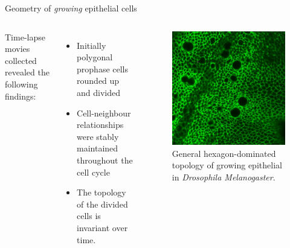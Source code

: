 \documentclass[aspectratio=169, 10pt]{beamer}
\begin{document}
\begin{frame}[fragile]{Geometry of \emph{growing} epithelial cells}    
    
  \begin{columns}[onlytextwidth]
      Time-lapse movies collected revealed the following findings:
        \begin{itemize}
          \item Initially polygonal prophase cells rounded up and divided
          \item Cell-neighbour relationships were stably maintained throughout the cell cycle
          \item The topology of the divided cells is invariant over time.
        \end{itemize}
     
       
          \begin{figure}
              \centering
              \includegraphics[width=.7\textwidth]{presentation/figures/supfig1.png}
              \caption{General hexagon-dominated topology of growing epithelial in \emph{Drosophila Melanogaster}.}
              \label{}
          \end{figure}
  \end{columns}
\end{frame}
\end{document}
